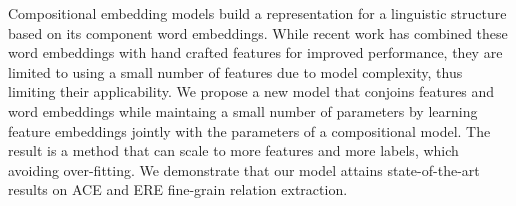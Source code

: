 Compositional embedding models build a representation for a linguistic structure based on its component word embeddings. While recent work has combined these word embeddings with hand crafted features for improved performance, they are limited to using a small number of features due to model complexity, thus limiting their applicability. We propose a new model that conjoins features and word embeddings while maintaing a small number of parameters by learning feature embeddings jointly with the parameters of a compositional model. The result is a method that can scale to more features and more labels, which avoiding over-fitting. We demonstrate that our model attains state-of-the-art results on ACE and ERE fine-grain relation extraction.
